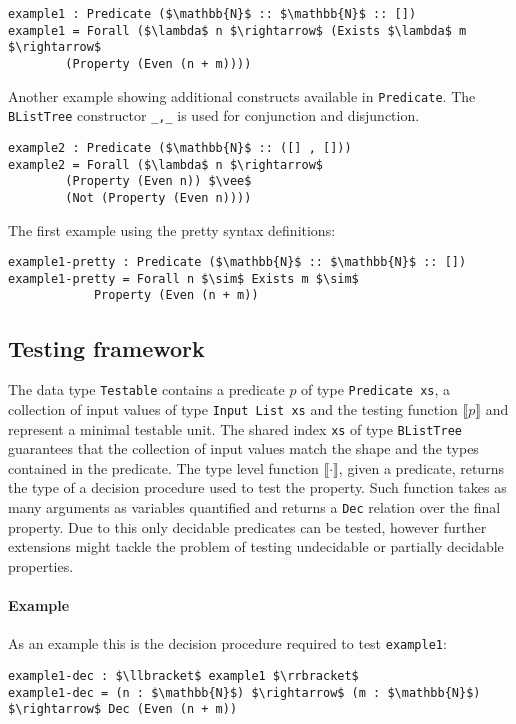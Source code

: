 \documentclass[10pt,a4paper]{article}
\begin{document}
\begin{itemize}
\begin{lstlisting}
example1 : Predicate ($\mathbb{N}$ :: $\mathbb{N}$ :: [])
example1 = Forall ($\lambda$ n $\rightarrow$ (Exists $\lambda$ m $\rightarrow$
		(Property (Even (n + m))))
\end{lstlisting}

Another example showing additional constructs available in \texttt{Predicate}.
The \texttt{BListTree} constructor \texttt{\_,\_} is used for conjunction and disjunction.
\begin{lstlisting}
example2 : Predicate ($\mathbb{N}$ :: ([] , []))
example2 = Forall ($\lambda$ n $\rightarrow$ 
		(Property (Even n)) $\vee$ 
		(Not (Property (Even n))))
\end{lstlisting}

The first example using the pretty syntax definitions:
\begin{lstlisting}
example1-pretty : Predicate ($\mathbb{N}$ :: $\mathbb{N}$ :: [])
example1-pretty = Forall n $\sim$ Exists m $\sim$ 
			Property (Even (n + m))
\end{lstlisting}

\end{itemize}

\subsection{Testing framework}
The data type \texttt{Testable} contains a predicate $p$ of type \texttt{Predicate xs}, a collection of input values of type \texttt{Input List xs} and the testing function $\llbracket p \rrbracket$ and represent a minimal testable unit. The shared index \texttt{xs} of type \texttt{BListTree} guarantees that the collection of input values match the shape and the types contained in the predicate.
The type level function $\llbracket \cdot \rrbracket$, given a predicate, returns the type of a decision procedure used to test the property.
Such function takes as many arguments as variables quantified and returns a \texttt{Dec} relation over the final property. Due to this only decidable predicates can be tested, however further extensions might tackle the problem of testing undecidable or partially decidable properties.

\paragraph{Example}
As an example this is the decision procedure required to test \texttt{example1}:
\begin{lstlisting}
example1-dec : $\llbracket$ example1 $\rrbracket$
example1-dec = (n : $\mathbb{N}$) $\rightarrow$ (m : $\mathbb{N}$) $\rightarrow$ Dec (Even (n + m))
\end{lstlisting}
\end{document}
